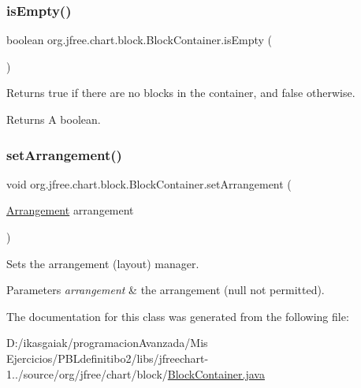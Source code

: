 \subsubsection{\texorpdfstring{is\+Empty()}{isEmpty()}}
{\footnotesize\ttfamily boolean org.\+jfree.\+chart.\+block.\+Block\+Container.\+is\+Empty (\begin{DoxyParamCaption}{ }\end{DoxyParamCaption})}

Returns {\ttfamily true} if there are no blocks in the container, and {\ttfamily false} otherwise.

\begin{DoxyReturn}{Returns}
A boolean. 
\end{DoxyReturn}
\mbox{\label{classorg_1_1jfree_1_1chart_1_1block_1_1_block_container_a66f84d14a89e3ac4f81898d71b7662c5}} 
\subsubsection{\texorpdfstring{set\+Arrangement()}{setArrangement()}}
{\footnotesize\ttfamily void org.\+jfree.\+chart.\+block.\+Block\+Container.\+set\+Arrangement (\begin{DoxyParamCaption}\item[{\mbox{\hyperlink{interfaceorg_1_1jfree_1_1chart_1_1block_1_1_arrangement}{Arrangement}}}]{arrangement }\end{DoxyParamCaption})}

Sets the arrangement (layout) manager.


\begin{DoxyParams}{Parameters}
{\em arrangement} & the arrangement ({\ttfamily null} not permitted). \\
\hline
\end{DoxyParams}


The documentation for this class was generated from the following file\+:\begin{DoxyCompactItemize}
\item 
D\+:/ikasgaiak/programacion\+Avanzada/\+Mis Ejercicios/\+P\+B\+Ldefinitibo2/libs/jfreechart-\/1../source/org/jfree/chart/block/\mbox{\hyperlink{_block_container_8java}{Block\+Container.\+java}}\end{DoxyCompactItemize}
